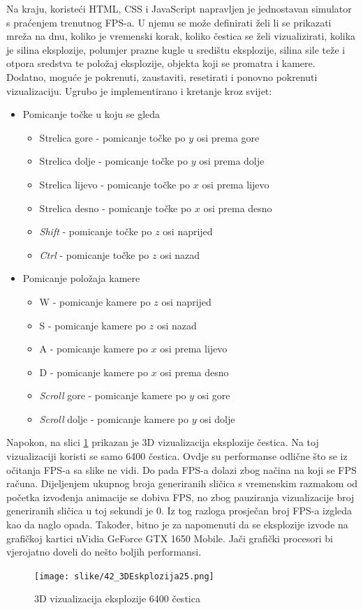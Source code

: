 \documentclass{foi}
\begin{document}
Na kraju, koristeći HTML, CSS i JavaScript napravljen je jednostavan simulator s praćenjem trenutnog FPS-a. U njemu se može definirati želi li se prikazati mreža na dnu, koliko je vremenski korak, koliko čestica se želi vizualizirati, kolika je silina eksplozije, polumjer prazne kugle u središtu eksplozije, silina sile teže i otpora sredstva te položaj eksplozije, objekta koji se promatra i kamere. Dodatno, moguće je pokrenuti, zaustaviti, resetirati i ponovno pokrenuti vizualizaciju. Ugrubo je implementirano i kretanje kroz svijet:
\begin{itemize}
	\item Pomicanje točke u koju se gleda
	\begin{itemize}
		\item Strelica gore - pomicanje točke po $y$ osi prema gore
		\item Strelica dolje - pomicanje točke po $y$ osi prema dolje
		\item Strelica lijevo - pomicanje točke po $x$ osi prema lijevo
		\item Strelica desno - pomicanje točke po $x$ osi prema desno
		\item \textit{Shift} - pomicanje točke po $z$ osi naprijed
		\item \textit{Ctrl} - pomicanje točke po $z$ osi nazad
	\end{itemize}
	\item Pomicanje položaja kamere
	\begin{itemize}
		\item W - pomicanje kamere po $z$ osi naprijed
		\item S - pomicanje kamere po $z$ osi nazad
		\item A - pomicanje kamere po $x$ osi prema lijevo
		\item D - pomicanje kamere po $x$ osi prema desno
		\item \textit{Scroll} gore - pomicanje kamere po $y$ osi gore
		\item \textit{Scroll} dolje - pomicanje kamere po $y$ osi dolje
	\end{itemize}
	
	
\end{itemize}

Napokon, na slici \ref{fig:3D_25} prikazan je 3D vizualizacija eksplozije čestica. Na toj vizualizaciji koristi se samo 6400 čestica. Ovdje su performanse odlične što se iz očitanja FPS-a sa slike ne vidi. Do pada FPS-a dolazi zbog načina na koji se FPS računa. Dijeljenjem ukupnog broja generiranih sličica s vremenskim razmakom od početka izvođenja animacije se dobiva FPS, no zbog pauziranja vizualizacije broj generiranih sličica u toj sekundi je 0. Iz tog razloga prosječan broj FPS-a izgleda kao da naglo opada. Također, bitno je za napomenuti da se eksplozije izvode na grafičkoj kartici nVidia GeForce GTX 1650 Mobile. Jači grafički procesori bi vjerojatno doveli do nešto boljih performansi.
\\
\begin{figure}[H]
	\centering
	\texttt{[image: slike/42\_3DEskplozija25.png]}
	\captionsetup{justification=centering}
	\caption{3D vizualizacija eksplozije 6400 čestica}
	\label{fig:3D_25}
\end{figure}
\end{document}
